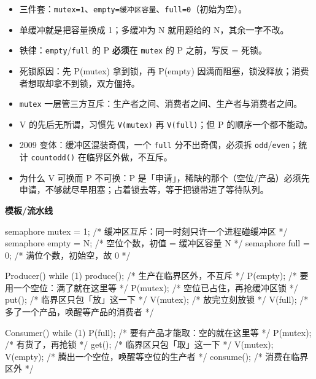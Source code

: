 \documentclass[10pt,a4paper]{ctexart}
\begin{document}
\begin{itemize}

\item 三件套：\texttt{mutex=1}、\texttt{empty=缓冲区容量}、\texttt{full=0}（初始为空）。

\item 单缓冲就是把容量换成 1；多缓冲为 N 就用题给的 N，其余一字不改。

\item 铁律：\texttt{empty}/\texttt{full} 的 P \textbf{必须}在 \texttt{mutex} 的 P 之前，写反 = 死锁。

\item 死锁原因：先 P(mutex) 拿到锁，再 P(empty) 因满而阻塞，锁没释放；消费者想取却拿不到锁，双方僵持。

\item \texttt{mutex} 一层管三方互斥：生产者之间、消费者之间、生产者与消费者之间。

\item V 的先后无所谓，习惯先 \texttt{V(mutex)} 再 \texttt{V(full)}；但 P 的顺序一个都不能动。

\item 2009 变体：缓冲区混装奇偶，一个 \texttt{full} 分不出奇偶，必须拆 \texttt{odd}/\texttt{even}；统计 \texttt{countodd()} 在临界区外做，不互斥。

\item 为什么 V 可换而 P 不可换：P 是「申请」，稀缺的那个（空位/产品）必须先申请，不够就尽早阻塞；占着锁去等，等于把锁带进了等待队列。

\end{itemize}

\textbf{模板/流水线}

\begin{codebox}
semaphore mutex = 1;      /* 缓冲区互斥：同一时刻只许一个进程碰缓冲区 */
semaphore empty = N;      /* 空位个数，初值 = 缓冲区容量 N */
semaphore full  = 0;      /* 满位个数，初始空，故 0 */

Producer() { while (1) {
    produce();                       /* 生产在临界区外，不互斥 */
    P(empty);                        /* 要用一个空位：满了就在这里等 */
    P(mutex);                        /* 空位已占住，再抢缓冲区锁 */
    put();                           /* 临界区只包「放」这一下 */
    V(mutex);                        /* 放完立刻放锁 */
    V(full);                         /* 多了一个产品，唤醒等产品的消费者 */
} }

Consumer() { while (1) {
    P(full);                         /* 要有产品才能取：空的就在这里等 */
    P(mutex);                        /* 有货了，再抢锁 */
    get();                           /* 临界区只包「取」这一下 */
    V(mutex);
    V(empty);                        /* 腾出一个空位，唤醒等空位的生产者 */
    consume();                       /* 消费在临界区外 */
} }
\end{codebox}
\end{document}
